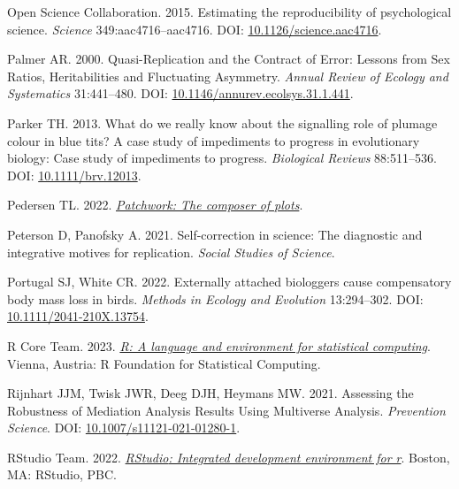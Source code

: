 \documentclass[10pt,a4paper]{article}
\newlength{\cslhangindent}
\newenvironment{CSLReferences}[2] %
 {\begin{list}{}{%
  \setlength{\itemindent}{0pt}
  \setlength{\leftmargin}{0pt}
  \setlength{\parsep}{0pt}
  \ifodd #1
   \setlength{\leftmargin}{\cslhangindent}
   \setlength{\itemindent}{-1\cslhangindent}
  \fi
  \setlength{\itemsep}{#2\baselineskip}}}
 {\end{list}}
\begin{document}
\begin{CSLReferences}{1}{0}
Open Science Collaboration. 2015. Estimating the reproducibility of psychological science. \emph{Science} 349:aac4716--aac4716. DOI: \href{https://doi.org/10.1126/science.aac4716}{10.1126/science.aac4716}.

Palmer AR. 2000. Quasi-{Replication} and the {Contract} of {Error}: {Lessons} from {Sex} {Ratios}, {Heritabilities} and {Fluctuating} {Asymmetry}. \emph{Annual Review of Ecology and Systematics} 31:441--480. DOI: \href{https://doi.org/10.1146/annurev.ecolsys.31.1.441}{10.1146/annurev.ecolsys.31.1.441}.

Parker TH. 2013. What do we really know about the signalling role of plumage colour in blue tits? {A} case study of impediments to progress in evolutionary biology: {Case} study of impediments to progress. \emph{Biological Reviews} 88:511--536. DOI: \href{https://doi.org/10.1111/brv.12013}{10.1111/brv.12013}.

Pedersen TL. 2022. \emph{\href{https://CRAN.R-project.org/package=patchwork}{Patchwork: The composer of plots}}.

Peterson D, Panofsky A. 2021. Self-correction in science: {The} diagnostic and integrative motives for replication. \emph{Social Studies of Science}.

Portugal SJ, White CR. 2022. Externally attached biologgers cause compensatory body mass loss in birds. \emph{Methods in Ecology and Evolution} 13:294--302. DOI: \href{https://doi.org/10.1111/2041-210X.13754}{10.1111/2041-210X.13754}.

R Core Team. 2023. \emph{\href{https://www.R-project.org/}{R: A language and environment for statistical computing}}. Vienna, Austria: R Foundation for Statistical Computing.

Rijnhart JJM, Twisk JWR, Deeg DJH, Heymans MW. 2021. Assessing the {Robustness} of {Mediation} {Analysis} {Results} {Using} {Multiverse} {Analysis}. \emph{Prevention Science}. DOI: \href{https://doi.org/10.1007/s11121-021-01280-1}{10.1007/s11121-021-01280-1}.

RStudio Team. 2022. \emph{\href{http://www.rstudio.com/}{{RStudio}: Integrated development environment for r}}. Boston, MA: RStudio, PBC.


\end{CSLReferences}
\end{document}
